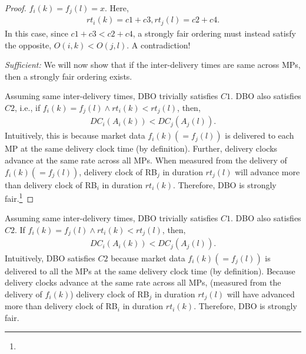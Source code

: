\documentclass{article}
\begin{document}
\begin{proof}
\noindent
{} $f_i(k) = f_j(l) = x$. Here,
\begin{align}
rt_i(k) = c1+c3, rt_j(l) = c2+c4.
\end{align}
In this case, since $c1+c3<c2+c4$, a strongly fair ordering must instead satisfy the opposite, $O(i,k) < O(j,l)$. A contradiction! 


\smallskip
\noindent
\textit{Sufficient:} We will now show that if the inter-delivery times are same across MPs, then a strongly fair ordering exists. 

Assuming same inter-delivery times, DBO trivially satisfies $C1$. DBO also satisfies $C2$, i.e.,  if $f_i(k) = f_j(l) \land rt_i(k) < rt_j(l)$, then,
\begin{align}
    DC_i(A_i(k)) < DC_j(A_j(l)). 
\end{align}
Intuitively, this is because market data $f_i(k) (= f_j(l))$ is delivered to each MP at the same delivery clock time (by definition). Further, delivery clocks advance at the same rate across all MPs. When measured from the delivery of $f_i(k) (= f_j(l))$, delivery clock of RB$_j$ in duration $rt_j(l)$ will advance more than delivery clock of RB$_i$ in duration $rt_i(k)$.
Therefore, DBO is strongly fair.\footnote{} 
\end{proof}

Assuming same inter-delivery times, DBO trivially satisfies $C1$. DBO also satisfies $C2$. If $f_i(k) = f_j(l) \land rt_i(k) < rt_j(l)$, then,
\begin{align}
    DC_i(A_i(k)) < DC_j(A_j(l)). 
\end{align}
Intuitively, DBO satisfies $C2$ because market data $f_i(k) (= f_j(l))$ is delivered to all the MPs at the same delivery clock time (by definition). Because delivery clocks advance at the same rate across all MPs, (measured from the delivery of $f_i(k)$) delivery clock of RB$_j$ in duration $rt_j(l)$ will have advanced more than delivery clock of RB$_i$ in duration $rt_i(k)$.
Therefore, DBO is strongly fair. 
\fi

% 
% 
\end{document}
